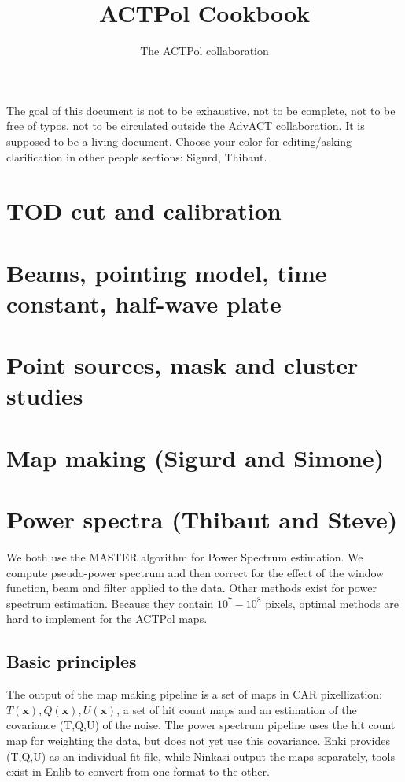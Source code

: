 \documentclass[a4paper, 11pt]{article}
\newcommand{\skn}[1]{{\color{red}#1}}
\newcommand{\TIB}[1]{{\color{blue}#1}}
\begin{document}
\title{\textbf{ACTPol Cookbook}}
\author{The ACTPol collaboration}
\maketitle

The goal of this document is not to be exhaustive, not to be complete, not
to be free of typos, not to be circulated outside the AdvACT collaboration.
It is supposed to be a living document.  Choose your color for
editing/asking clarification in other people sections: \skn{Sigurd}, \TIB{Thibaut}.

\section{TOD cut and calibration}

\section{Beams, pointing model, time constant, half-wave plate}

\section{Point sources, mask and cluster studies}


\section{Map making (Sigurd and Simone)}

\section{Power spectra (Thibaut and Steve)}

We both use the MASTER algorithm for Power Spectrum estimation. We compute pseudo-power spectrum and then correct for the effect of the window function, beam and filter applied to the data. Other methods exist for power spectrum estimation. Because they contain $10^{7}-10^{8}$ pixels, optimal methods are hard to implement for the ACTPol maps.

\subsection{Basic principles}\label{subsec:PSbasis}

The output of the map making pipeline is a set of maps in CAR pixellization: $T(\bm{x}), Q(\bm{x}), U(\bm{x})$, a set of hit count maps and an estimation of the covariance (T,Q,U) of the noise. The power spectrum pipeline uses the hit count map for weighting the data, but  does not yet use this covariance.
Enki provides (T,Q,U) as an individual fit file, while Ninkasi output the maps separately, tools exist in Enlib to convert from one format to the other. 
\end{document}

